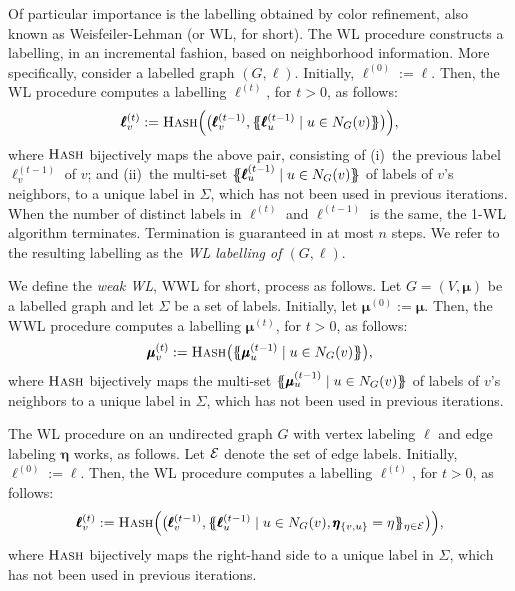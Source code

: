 Of particular importance is the labelling obtained by color refinement, also
known as Weisfeiler-Lehman (or WL, for short). The WL procedure constructs a
labelling, in an incremental fashion, based on neighborhood information. More
specifically, consider a labelled graph $(G,\pmb{\ell})$. Initially,
$\pmb{\ell}^{(0)}:=\pmb{\ell}$. Then, the WL procedure computes a labelling
$\pmb{\ell}^{(t)}$, for $t> 0$, as follows:
\[
    \pmb{\ell}^{(t)}_v:=\textsc{Hash}\Bigl(\bigl(\pmb{\ell}^{(t-1)}_v,\{\!\!\{
    \pmb{\ell}_u^{(t-1)} \mathrel{\mid} u \in N_G(v) \}\!\!\}\bigr)\Bigr),
\]
where
$\textsc{Hash}$ bijectively maps the above pair, consisting of (i)~the
previous label $\pmb{\ell}^{(t-1)}_v$ of $v$; and (ii)~the multi-set $\{\!\!\{
\pmb{\ell}_u^{(t-1)} \mathrel{\mid} u \in N_G(v) \}\!\!\}$ of labels of $v$'s neighbors, to
a unique label in $\Sigma$, which has not been used in previous iterations.
When the number of distinct labels in $\pmb{\ell}^{(t)}$ and
$\pmb{\ell}^{(t-1)}$ is the same, the 1-WL algorithm terminates.  Termination
is guaranteed in at most $n$ steps. We refer to the resulting labelling as the
\textit{WL labelling of $(G,\pmb{\ell})$}. 


We define the \textit{weak WL}, WWL for short, process as follows. Let
$G=(V,\pmb{\mu})$ be a labelled graph and let $\Sigma$ be a set of labels.
Initially, let $\pmb{\mu}^{(0)}:=\pmb{\mu}$.  Then, the WWL procedure computes
a labelling $\pmb{\mu}^{(t)}$, for $t> 0$, as follows: $$
\pmb{\mu}^{(t)}_v:=\textsc{Hash}\bigl(\{\!\!\{ \pmb{\mu}_u^{(t-1)} \mathrel{\mid} u \in
N_G(v) \}\!\!\}\bigr), $$ where $\textsc{Hash}$ bijectively maps the multi-set
$\{\!\!\{ \pmb{\mu}_u^{(t-1)} \mathrel{\mid} u \in N_G(v) \}\!\!\}$ of labels of $v$'s
neighbors to a unique label in $\Sigma$, which has not been used in previous
iterations. 


The WL procedure on an undirected graph $G$ with vertex labeling $\pmb{\ell}$ and edge labeling $\pmb{\eta}$ works, as follows.  Let ${\cal E}$ denote the set of edge labels. Initially, 
$\pmb{\ell}^{(0)}:=\pmb{\ell}$. Then, the WL procedure computes a labelling $\pmb{\ell}^{(t)}$, for $t> 0$, as follows: 
$$
\pmb{\ell}^{(t)}_v:=\textsc{Hash}\Bigl(\bigl(\pmb{\ell}^{(t-1)}_v,\{\!\!\{ \pmb{\ell}_u^{(t-1)} \mathrel{\mid} u \in N_G(v), \pmb{\eta}_{\{v,u\}}=\eta \}\!\!\}_{\eta\in{\cal E}}\bigr)\Bigr),
$$
where $\textsc{Hash}$ bijectively maps the right-hand side to a unique label in $\Sigma$, which has not been used in previous iterations.
